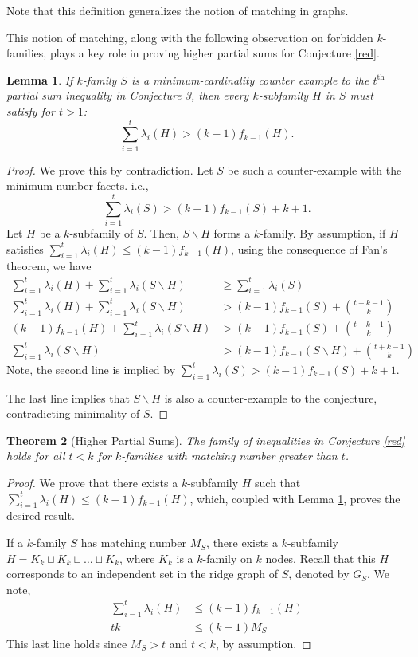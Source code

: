 \documentclass[11pt]{article}
\newtheorem{lm}{Lemma}
\newtheorem{thm}[lm]{Theorem}
\begin{document}
Note that this definition generalizes the notion of matching in graphs.

This notion of matching, along with the following observation on forbidden $k$-families, plays a key role in proving higher partial sums for Conjecture \ref{red}.

\begin{lm}\label{lm:forbidden}
If $k$-family $S$ is a minimum-cardinality counter example to the $t^{\text{th}}$ partial sum inequality in Conjecture 3, then every $k$-subfamily $H$ in $S$ must satisfy for $t > 1$:
$$\sum_{i = 1}^t \lambda_i(H) >(k - 1) f_{k - 1}(H).$$
\end{lm}

\begin{proof}
We prove this by contradiction. Let $S$ be such a counter-example with the minimum number facets. i.e.,
$$\sum_{i=1}^t \lambda_i (S) > (k-1)f_{k-1} (S) + k + 1. $$
Let $H$ be a $k$-subfamily of $S$. Then, $S \backslash H$ forms a $k$-family. By assumption, if $H$ satisfies $\sum_{i=1}^t \lambda_i (H) \leq (k-1)f_{k-1} (H)$, using the consequence of Fan's theorem, we have
\begin{align*}
\sum_{i=1}^t \lambda_i (H ) + \sum_{i=1}^t \lambda_i (S \backslash H) &\geq \sum_{i = 1}^t \lambda_i (S)\\
\sum_{i=1}^t \lambda_i (H ) + \sum_{i=1}^t \lambda_i (S \backslash H) & > (k-1)f_{k-1} (S) + \binom{t +k -1}{k}\\
(k-1) f_{k-1} (H) + \sum_{i=1}^t \lambda_i ( S \backslash H) &> (k-1)f_{k-1} (S) + \binom{t +k -1}{k}\\
\sum_{i=1}^t \lambda_i ( S \backslash H) & > (k-1)f_{k-1} (S \backslash H) + \binom{t +k -1}{k}
\end{align*}
Note, the second line is implied by $\sum_{i=1}^t \lambda_i (S) > (k-1)f_{k-1} (S) + k + 1.$

The last line implies that $S \backslash H$ is also a counter-example to the conjecture, contradicting minimality of $S$.
\end{proof}


\begin{thm}[Higher Partial Sums]\label{thm:hps}
The family of inequalities in Conjecture \ref{red} holds for all $t < k$ for $k$-families with matching number greater than $t$.
\end{thm}

\begin{proof}
We prove that there exists a $k$-subfamily $H$ such that $\sum_{i = 1}^t \lambda_i(H) \leq (k - 1) f_{k - 1}(H)$, which, coupled with Lemma \ref{lm:forbidden}, proves the desired result.

If a $k$-family $S$ has matching number $M_S$, there exists a $k$-subfamily $H = K_k \sqcup K_k \sqcup \ldots \sqcup K_k$, where $K_k$ is a $k$-family on $k$ nodes. Recall that this $H$ corresponds to an independent set in the ridge graph of $S$, denoted by $G_S$. We note,
\begin{align*}
\sum_{i = 1}^t \lambda_i(H) &\leq (k-1) f_{k - 1}(H)\\
tk & \leq (k -1) M_S
\end{align*}
This last line holds since $M_S > t$ and $t < k$, by assumption.
\end{proof}
\end{document}
